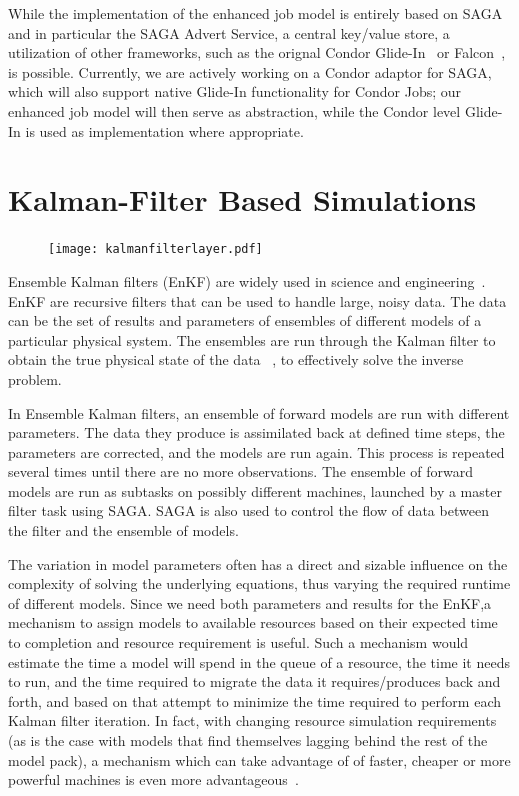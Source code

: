 \documentclass[conference,final]{IEEEtran}
\begin{document}
While the implementation of the enhanced job model is entirely based
on SAGA and in particular the SAGA Advert Service, a central key/value
store, a utilization of other frameworks, such as the orignal Condor
Glide-In~\cite{citeulike:291860} or Falcon~\cite{1362680}, is
possible. Currently, we are actively working on a Condor adaptor for
SAGA, which will also support native Glide-In functionality for Condor
Jobs; our enhanced job model will then serve as abstraction, while the
Condor level Glide-In is used as implementation where appropriate.

\section{Kalman-Filter Based Simulations}

\begin{figure}[htbp]
    \centering
    \texttt{[image: kalmanfilterlayer.pdf]}
    \caption{}
    \label{fig:remdmanager_v11}
\end{figure}  

Ensemble Kalman filters (EnKF) are widely used in science and
engineering~\cite{DataAssim, KalmanPaper, LiEnKF07, DO2007, DO2006}.
EnKF are recursive filters that can be used to handle large, noisy
data. The data can be the set of results and parameters of ensembles
of different models of a particular physical system. The ensembles are
run through the Kalman filter to obtain the true physical state of the
data ~\cite{DataAssim,KalmanPaper}, to effectively solve the inverse
problem.

In Ensemble Kalman filters, an ensemble of forward models are run
with different parameters. The data they produce is assimilated
back at defined time steps, the parameters are corrected, and the 
models are run again. This process is repeated several times until
there are no more observations. The ensemble of forward models are
run as subtasks on possibly different machines, launched by a master
filter task using SAGA. SAGA is also used to control the flow of
data between the filter and the ensemble of models.

The variation in model parameters often has a direct and sizable
influence on the complexity of solving the underlying equations, thus
varying the required runtime of different models. Since we need both
parameters and results for the EnKF,a mechanism to assign models to
available resources based on their expected time to completion and
resource requirement is useful.  Such a mechanism would estimate the
time a model will spend in the queue of a resource, the time it needs
to run, and the time required to migrate the data it requires/produces
back and forth, and based on that attempt to minimize the time
required to perform each Kalman filter iteration.  In fact, with
changing resource simulation requirements (as is the case with models
that find themselves lagging behind the rest of the model pack), a
mechanism which can take advantage of of faster, cheaper or more
powerful machines is even more advantageous~\cite{escience07}.
\end{document}
